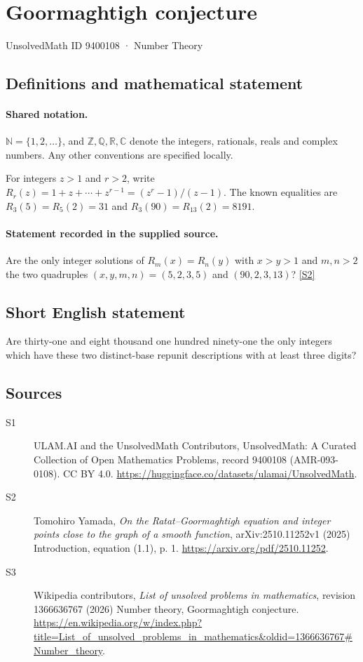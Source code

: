 \documentclass[11pt]{article}
\newcommand{\sref}[2]{\hyperlink{source:#1:#2}{[S#2]}}
\begin{document}
\setcounter{section}{9400107}
\section{Goormaghtigh conjecture}\label{9400108}
{\small\sffamily UnsolvedMath ID 9400108 · Number Theory}
\subsection{Definitions and mathematical statement}

\paragraph{Shared notation.}$\mathbb N=\{1,2,\ldots\}$, and $\mathbb Z,\mathbb Q,\mathbb R,\mathbb C$ denote the integers, rationals, reals and complex numbers. Any other conventions are specified locally.


For integers $z>1$ and $r>2$, write $R_r(z)=1+z+\cdots+z^{r-1}=(z^r-1)/(z-1)$. The known equalities are $R_3(5)=R_5(2)=31$ and $R_3(90)=R_{13}(2)=8191$.
\paragraph{Statement recorded in the supplied source.}
Are the only integer solutions of $R_m(x)=R_n(y)$ with $x>y>1$ and $m,n>2$ the two quadruples $(x,y,m,n)=(5,2,3,5)$ and $(90,2,3,13)$? \sref{9400108}{2}
\subsection{Short English statement}
Are thirty-one and eight thousand one hundred ninety-one the only integers which have these two distinct-base repunit descriptions with at least three digits?
\subsection{Sources}
\begin{description}
\item[\hypertarget{source:9400108:1}{S1}] ULAM.AI and the UnsolvedMath Contributors, UnsolvedMath: A Curated Collection of Open Mathematics Problems, record 9400108 (AMR-093-0108). CC BY 4.0. \url{https://huggingface.co/datasets/ulamai/UnsolvedMath}.
\item[\hypertarget{source:9400108:2}{S2}] Tomohiro Yamada, \emph{On the Ratat--Goormaghtigh equation and integer points close to the graph of a smooth function}, arXiv:2510.11252v1 (2025) Introduction, equation (1.1), p. 1. \url{https://arxiv.org/pdf/2510.11252}.
\item[\hypertarget{source:9400108:3}{S3}] Wikipedia contributors, \emph{List of unsolved problems in mathematics}, revision 1366636767 (2026) Number theory, Goormaghtigh conjecture. \url{https://en.wikipedia.org/w/index.php?title=List_of_unsolved_problems_in_mathematics&oldid=1366636767#Number_theory}.
\end{description}
\label{end:9400108}
\end{document}
